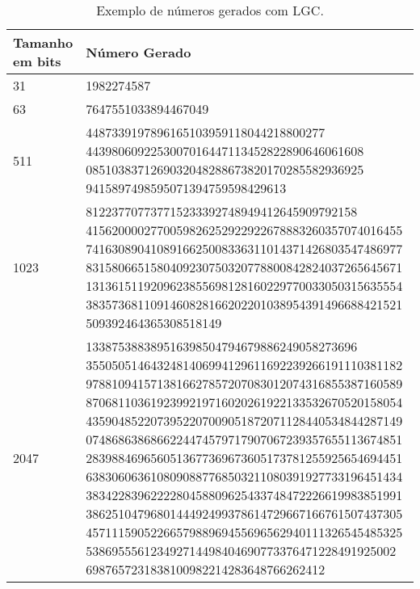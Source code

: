 \documentclass[openany]{ufsctex/ufsctex}
\begin{document}
\begin{longtable}{|p{3cm} | p{9cm} |}
 \caption{Exemplo de números gerados com LGC.}\label{tab:numerosLGC}\\
\hline
Tamanho em bits & Número Gerado  \\
\hline
31 & 1982274587 \\
\hline
63 & 7647551033894467049 \\
\hline
511 & 4487339197896165103959118044218800277 
4439806092253007016447113452822890646061608 
0851038371269032048288673820170285582936925 
9415897498595071394759598429613 \\
\hline
1023 & 812237707737715233392748949412645909792158
4156200002770059826252922922678883260357074016455
7416308904108916625008336311014371426803547486977
8315806651580409230750320778800842824037265645671
1313615119209623855698128160229770033050315635554
3835736811091460828166202201038954391496688421521
509392464365308518149 \\
\hline
2047 & 133875388389516398504794679886249058273696
3550505146432481406994129611692239266191110381182
9788109415713816627857207083012074316855387160589
8706811036192399219716020261922133532670520158054
4359048522073952207009051872071128440534844287149
0748686386866224474579717907067239357655113674851
2839884696560513677369673605173781255925654694451
6383060636108090887768503211080391927733196451434
3834228396222280458809625433748472226619983851991
3862510479680144492499378614729667166761507437305
4571115905226657988969455696562940111326545485325
538695556123492714498404690773376471228491925002
6987657231838100982214283648766262412\\
\hline
\end{longtable}


	 
\end{document}
